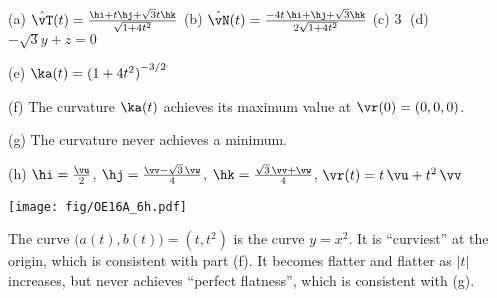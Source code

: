 \begin{answer} 
(a) $\hat\vT(t)=\frac{\hi + t\hj + \sqrt{3} t\hk }{\sqrt{1+4t^2}}$\quad
(b) $\hat\vN(t)=\frac{-4t\,\hi + \hj + \sqrt{3} \hk }{2\sqrt{1+4t^2}}$\quad
(c) \textcircled{3}  \quad
(d) $-\sqrt{3} y + z=0$ \quad

(e) $\ka(t)={(1+4t^2)}^{-3/2}$\quad

(f) The curvature $\ka(t)$ achieves its maximum value at $\vr(0)=(0,0,0)$.\quad

(g) The curvature never achieves a minimum.

(h) $\hi=\frac{\vu}{2}$, 
    $\hj=\frac{\vv-\sqrt{3}\,\vw}{4}$,
    $\hk=\frac{\sqrt{3}\,\vv+\vw}{4}$,
    $\vr(t) = t\,\vu + t^2 \,\vv$

\begin{center}
       \texttt{[image: fig/OE16A\_6h.pdf]}
\end{center}

The curve $\big(a(t),b(t)\big)=(t,t^2)$ is the curve $y=x^2$.
It is ``curviest'' at the origin, which is consistent with part (f).
It becomes flatter and flatter as $|t|$ increases, but never achieves
``perfect flatness'', which is consistent with (g).


\end{answer}

